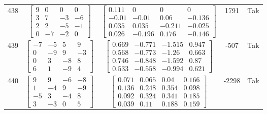 \documentclass[a4paper,12pt]{article}
\begin{document}
\begin{tabular}{c c c c c}
438
&
$\begin{bmatrix} 9 & 0 & 0 & 0 \\ 3 & 7 & -3 & -6 \\ 2 & 2 & -5 & -1 \\ 0 & -7 & -2 & 0 \end{bmatrix}$
&
$\begin{bmatrix} 0.111 & 0 & 0 & 0 \\ -0.01 & -0.01 & 0.06 & -0.136 \\ 0.035 & 0.035 & -0.211 & -0.025 \\ 0.026 & -0.196 & 0.176 & -0.146 \end{bmatrix}$
&
1791
&
Tak
\\
439
&
$\begin{bmatrix} -7 & -5 & 5 & 9 \\ 0 & -9 & 9 & -3 \\ 0 & 3 & -8 & 8 \\ 6 & 1 & -9 & 4 \end{bmatrix}$
&
$\begin{bmatrix} 0.669 & -0.771 & -1.515 & 0.947 \\ 0.568 & -0.773 & -1.26 & 0.663 \\ 0.746 & -0.848 & -1.592 & 0.87 \\ 0.533 & -0.558 & -0.994 & 0.621 \end{bmatrix}$
&
-507
&
Tak
\\
440
&
$\begin{bmatrix} 9 & 9 & -6 & -8 \\ 1 & -4 & 9 & -9 \\ -5 & 3 & -4 & 8 \\ 3 & -3 & 0 & 5 \end{bmatrix}$
&
$\begin{bmatrix} 0.071 & 0.065 & 0.04 & 0.166 \\ 0.136 & 0.248 & 0.354 & 0.098 \\ 0.092 & 0.324 & 0.341 & 0.185 \\ 0.039 & 0.11 & 0.188 & 0.159 \end{bmatrix}$
&
-2298
&
Tak
\\
\end{tabular} \egroup \newpage
\end{document}
